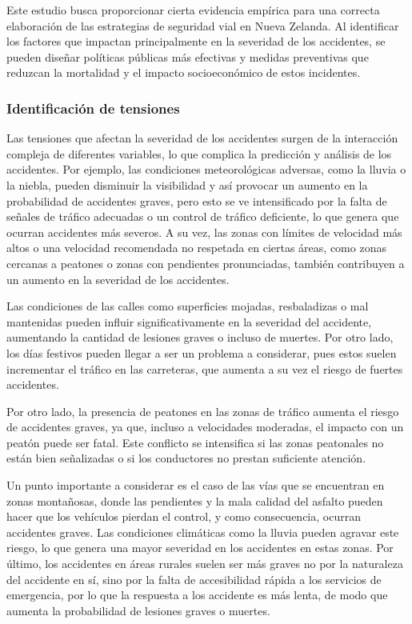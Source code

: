 \documentclass{book}
\begin{document}
Este estudio busca proporcionar cierta evidencia empírica para una correcta elaboración de las estrategias de seguridad vial en Nueva Zelanda. Al identificar los factores que impactan principalmente en la severidad de los accidentes, se pueden diseñar políticas públicas más efectivas y medidas preventivas que reduzcan la mortalidad y el impacto socioeconómico de estos incidentes.

\subsubsection{Identificación de tensiones}

Las tensiones que afectan la severidad de los accidentes surgen de la interacción compleja de diferentes variables, lo que complica la predicción y análisis de los accidentes. Por ejemplo, las condiciones meteorológicas adversas, como la lluvia o la niebla, pueden disminuir la visibilidad y así provocar un aumento en la probabilidad de accidentes graves, pero esto se ve intensificado por la falta de señales de tráfico adecuadas o un control de tráfico deficiente, lo que genera que ocurran accidentes más severos. A su vez, las zonas con límites de velocidad más altos o una velocidad recomendada no respetada en ciertas áreas, como zonas cercanas a peatones o zonas con pendientes pronunciadas, también contribuyen a un aumento en la severidad de los accidentes.

Las condiciones de las calles como superficies mojadas, resbaladizas o mal mantenidas pueden influir significativamente en la severidad del accidente, aumentando la cantidad de lesiones graves o incluso de muertes. Por otro lado, los días festivos pueden llegar a ser un problema a considerar, pues estos suelen incrementar el tráfico en las carreteras, que aumenta a su vez el riesgo de fuertes accidentes. 

Por otro lado, la presencia de peatones en las zonas de tráfico aumenta el riesgo de accidentes graves, ya que, incluso a velocidades moderadas, el impacto con un peatón puede ser fatal. Este conflicto se intensifica si las zonas peatonales no están bien señalizadas o si los conductores no prestan suficiente atención.

Un punto importante a considerar es el caso de las vías que se encuentran en zonas montañosas, donde las pendientes y la mala calidad del asfalto pueden hacer que los vehículos pierdan el control, y como consecuencia, ocurran accidentes graves. Las condiciones climáticas como la lluvia pueden agravar este riesgo, lo que genera una mayor severidad en los accidentes en estas zonas. Por último, los accidentes en áreas rurales suelen ser más graves no por la naturaleza del accidente en sí, sino por la falta de accesibilidad rápida a los servicios de emergencia, por lo que la respuesta a los accidente es más lenta, de modo que aumenta la probabilidad de lesiones graves o muertes.
\end{document}
